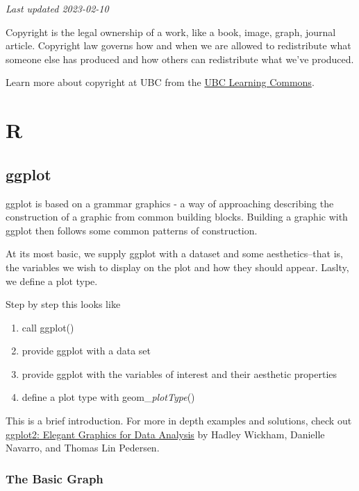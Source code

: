 \documentclass[
]{book}
\providecommand{\tightlist}{%
  \setlength{\itemsep}{0pt}\setlength{\parskip}{0pt}}
\begin{document}
\emph{Last updated 2023-02-10}

Copyright is the legal ownership of a work, like a book, image, graph, journal article. Copyright law governs how and when we are allowed to redistribute what someone else has produced and how others can redistribute what we've produced.

Learn more about copyright at UBC from the \href{https://copyright.ubc.ca/}{UBC Learning Commons}.

\hypertarget{part-r}{%
\part*{R}\label{part-r}}

\hypertarget{ggplot}{%
\chapter{ggplot}\label{ggplot}}

ggplot is based on a grammar graphics - a way of approaching describing the construction of a graphic from common building blocks. Building a graphic with ggplot then follows some common patterns of construction.

At its most basic, we supply ggplot with a dataset and some aesthetics--that is, the variables we wish to display on the plot and how they should appear. Laslty, we define a plot type.

Step by step this looks like

\begin{enumerate}
\def\labelenumi{\arabic{enumi}.}
\tightlist
\item
  call ggplot()
\item
  provide ggplot with a data set
\item
  provide ggplot with the variables of interest and their aesthetic properties
\item
  define a plot type with geom\_\emph{plotType}()
\end{enumerate}

This is a brief introduction. For more in depth examples and solutions, check out \href{https://ggplot2-book.org/index.html}{ggplot2: Elegant Graphics for Data Analysis} by Hadley Wickham, Danielle Navarro, and Thomas Lin Pedersen.

\hypertarget{the-basic-graph}{%
\section{The Basic Graph}\label{the-basic-graph}}
\end{document}

